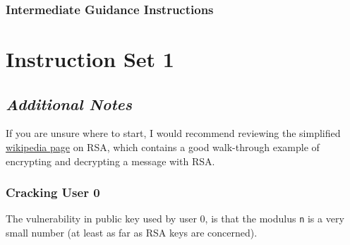        \newpage







        \subsubsection{Intermediate Guidance Instructions}







            {\parindent0pt\singlespacing







                \section*{Instruction Set 1}







                    \subsection*{\textit{Additional Notes}}







                        If you are unsure where to start, I would recommend reviewing the simplified \href{https://simple.wikipedia.org/wiki/RSA_algorithm}{wikipedia page} on RSA, which contains a good walk-through example of encrypting and decrypting a message with RSA.















                        \subsubsection*{Cracking User 0}







                            The vulnerability in public key used by user 0, is that the modulus \lstinline`n` is a very small number (at least as far as RSA keys are concerned).







}
